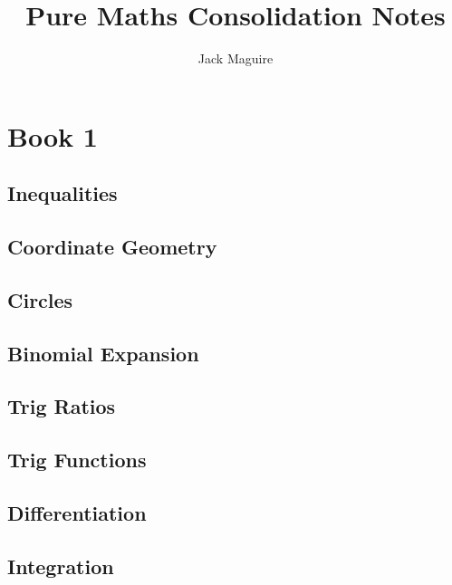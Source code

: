 \documentclass{report}
\title{\huge{Pure Maths Consolidation Notes}}
\author{\huge{Jack Maguire}}
\date{}
\begin{document}
\maketitle

\tableofcontents
\pagebreak

\part{Book 1}

\setcounter{chapter}{2}
\chapter{Inequalities}


\setcounter{chapter}{4}
\chapter{Coordinate Geometry}


\chapter{Circles}


\setcounter{chapter}{7}
\chapter{Binomial Expansion}


\chapter{Trig Ratios}


\chapter{Trig Functions}


\setcounter{chapter}{11}
\chapter{Differentiation}


\chapter{Integration}

\end{document}

